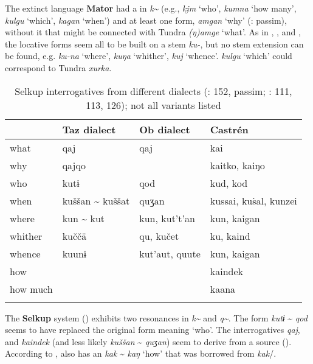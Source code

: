 The extinct language \textbf{Mator} had a  in \textit{k{\textasciitilde}} (e.g., \textit{ki̮}\textit{m} ‘who’, \textit{kumna} ‘how many’, \textit{kulgu} ‘which’, \textit{kagan} ‘when’) and at least one form, \textit{amgan} ‘why’ (\citealt{Helimski1997}: passim), without it that might be connected with Tundra  \textit{(ŋ)amge} ‘what’. As in , , and , the locative forms seem all to be built on a stem \textit{ku-}, but no stem extension can be found, e.g. \textit{ku-na} ‘where’, \textit{kuŋa} ‘whither’, \textit{kuj} ‘whence’.  \textit{kulgu} ‘which’ could correspond to Tundra  \textit{xurka}.

\begin{table}
\caption{Selkup interrogatives from different dialects (\citealt{Wagner-Nagy2015}: 152, passim; \citealt{Castrén1855}: 111, 113, 126); not all variants listed}
\label{tab:ural:10}

\begin{tabularx}{\textwidth}{XXXl}
\lsptoprule
& \textbf{Taz dialect} & \textbf{Ob dialect} & \textbf{Castrén}\\
\midrule
what & qaj & qaj & kai\\
why & qajqo &  & kaitko, kaiŋo\\
who & kutɨ & qod & kud, kod\\
when & kuššan {\textasciitilde} kuššat & quʒan & kussai, kuṡal, kunzei\\
where & kun {\textasciitilde} kut & kun, kut’t’an & kun, kaigan\\
whither & kuččä & qu, kučet & ku, kaind\\
whence & kuunɨ & kut’aut, quute & kun, kaigan\\
how &  &  & kaindek\\
how much &  &  & kaana\\
\lspbottomrule
\end{tabularx}
\end{table}

The \textbf{Selkup}  system () exhibits two resonances in \textit{k{\textasciitilde}} and \textit{q{\textasciitilde}}. The form \textit{kutɨ} {\textasciitilde} \textit{qod} seems to have replaced the original form meaning ‘who’. The interrogatives \textit{qaj}, and \textit{kaindek} (and less likely \textit{kuššan} {\textasciitilde} \textit{quʒan}) seem to derive from a  source (). According to \cite[111]{Castrén1855},  also has an  \textit{kak} {\textasciitilde} \textit{kaŋ} ‘how’ that was borrowed from  \textit{kak}/.

